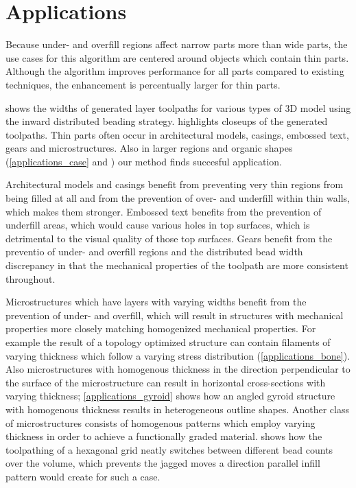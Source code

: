 \section{Applications}
Because under- and overfill regions affect narrow parts more than wide parts, the use cases for this algorithm are centered around objects which contain thin parts.
Although the algorithm improves performance for all parts compared to existing techniques, the enhancement is percentually larger for thin parts.


 shows the widths of generated layer toolpaths for various types of 3D model using the inward distributed beading strategy.
 highlights closeups of the generated toolpaths.
Thin parts often occur in architectural models, casings, embossed text, gears and microstructures.
Also in larger regions and organic shapes (\cref{applications_case} and ) our method finds succesful application.

Architectural models and casings benefit from preventing very thin regions from being filled at all and from the prevention of over- and underfill within thin walls, which makes them stronger.
Embossed text benefits from the prevention of underfill areas, which would cause various holes in top surfaces, which is detrimental to the visual quality of those top surfaces.
Gears benefit from the preventio of under- and overfill regions and the distributed bead width discrepancy in that the mechanical properties of the toolpath are more consistent throughout.

Microstructures which have layers with varying widths benefit from the prevention of under- and overfill, which will result in structures with mechanical properties more closely matching homogenized mechanical properties.
For example the result of a topology optimized structure can contain filaments of varying thickness \cite{wu2017infill} which follow a varying stress distribution (\cref{applications_bone}).
Also microstructures with homogenous thickness in the direction perpendicular to the surface of the microstructure can result in horizontal cross-sections with varying thickness;
\cref{applications_gyroid} shows how an angled gyroid structure with homogenous thickness results in heterogeneous outline shapes.
Another class of microstructures consists of homogenous patterns which employ varying thickness in order to achieve a functionally graded material.
 shows how the toolpathing of a hexagonal grid neatly switches between different bead counts over the volume, which prevents the jagged moves a direction parallel infill pattern would create for such a case. \cite{bates2018compressive}



